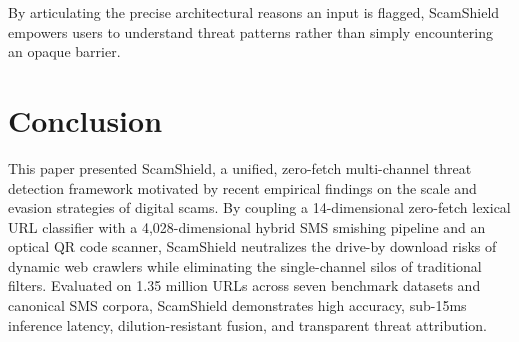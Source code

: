 \documentclass[conference]{IEEEtran}
\begin{document}
By articulating the precise architectural reasons an input is flagged, ScamShield empowers users to understand threat patterns rather than simply encountering an opaque barrier.

\section{Conclusion}
This paper presented ScamShield, a unified, zero-fetch multi-channel threat detection framework motivated by recent empirical findings on the scale and evasion strategies of digital scams. By coupling a 14-dimensional zero-fetch lexical URL classifier with a 4,028-dimensional hybrid SMS smishing pipeline and an optical QR code scanner, ScamShield neutralizes the drive-by download risks of dynamic web crawlers while eliminating the single-channel silos of traditional filters. Evaluated on 1.35 million URLs across seven benchmark datasets and canonical SMS corpora, ScamShield demonstrates high accuracy, sub-15ms inference latency, dilution-resistant fusion, and transparent threat attribution.



\end{document}
